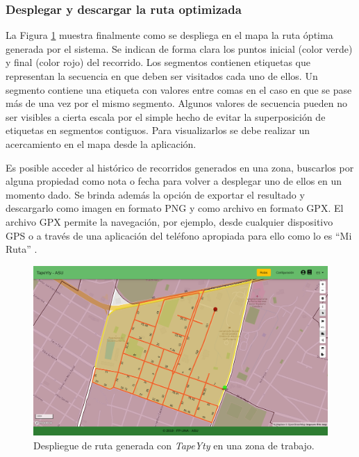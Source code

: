 \subsubsection{Desplegar y descargar la ruta optimizada}

La Figura \ref{fig:generacionRuta} muestra finalmente como se despliega en el mapa la ruta óptima generada por el sistema. Se indican de forma clara los puntos inicial (color verde) y final (color rojo) del recorrido. Los segmentos contienen etiquetas que representan la secuencia en que deben ser visitados cada uno de ellos. Un segmento contiene una etiqueta con valores entre comas en el caso en que se pase más de una vez por el mismo segmento. Algunos valores de secuencia pueden no ser visibles a cierta escala por el simple hecho de evitar la superposición de etiquetas en segmentos contiguos. Para visualizarlos se debe realizar un acercamiento en el mapa desde la aplicación.

Es posible acceder al histórico de recorridos generados en una zona, buscarlos por alguna propiedad como nota o fecha para volver a desplegar uno de ellos en un momento dado. Se brinda además la opción de exportar el resultado y descargarlo como imagen en formato PNG y como archivo en formato GPX. El archivo GPX permite la navegación, por ejemplo, desde cualquier dispositivo GPS o a través de una aplicación del teléfono apropiada para ello como lo es ``Mi Ruta'' \citep{MiRuta}.

\begin{figure}[H]
\centerline{\includegraphics[width=\textwidth]{generacionRuta.png}}
\caption{Despliegue de ruta generada con \textit{TapeYty} en una zona de trabajo.}
\label{fig:generacionRuta}
\end{figure}



